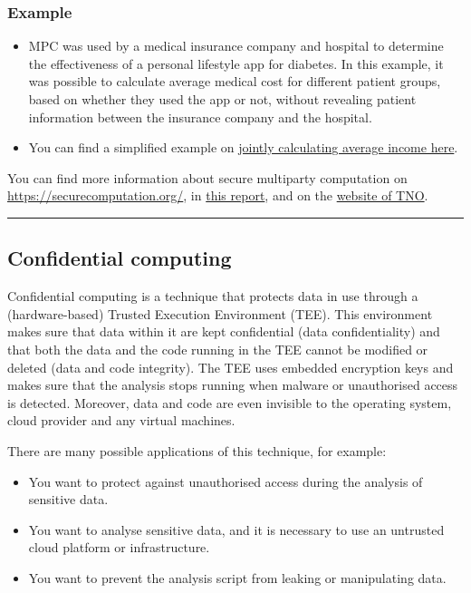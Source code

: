 \documentclass[
]{book}
\providecommand{\tightlist}{%
  \setlength{\itemsep}{0pt}\setlength{\parskip}{0pt}}
\begin{document}
\hypertarget{example}{%
\subsubsection{Example}\label{example}}

\begin{itemize}
\tightlist
\item
  MPC was used by a medical insurance company and hospital to determine the
  effectiveness of a personal lifestyle app for diabetes. In this example, it was
  possible to calculate average medical cost for different patient groups, based
  on whether they used the app or not, without revealing patient information
  between the insurance company and the hospital.
\item
  You can find a simplified example on
  \href{https://www.geeksforgeeks.org/what-is-secure-multiparty-computation/}{jointly calculating average income here}.
\end{itemize}

You can find more information about secure multiparty computation on
\url{https://securecomputation.org/}, in
\href{http://resolver.tudelft.nl/uuid:8002b966-7bba-427c-b343-56326c1a587b}{this report},
and on the \href{https://mpc.tno.nl}{website of TNO}.

\begin{center}\rule{0.5\linewidth}{0.5pt}\end{center}

\hypertarget{confidential-computing}{%
\subsection{Confidential computing}\label{confidential-computing}}

Confidential computing is a technique that protects data in use through a
(hardware-based) Trusted Execution Environment (TEE). This environment makes
sure that data within it are kept confidential (data confidentiality) and that
both the data and the code running in the TEE cannot be modified or deleted
(data and code integrity). The TEE uses embedded encryption keys and makes sure
that the analysis stops running when malware or unauthorised access is detected.
Moreover, data and code are even invisible to the operating system, cloud
provider and any virtual machines.

There are many possible applications of this technique, for example:

\begin{itemize}
\tightlist
\item
  You want to protect against unauthorised access during the analysis of
  sensitive data.
\item
  You want to analyse sensitive data, and it is necessary to use an untrusted
  cloud platform or infrastructure.
\item
  You want to prevent the analysis script from leaking or manipulating data.
\end{itemize}
\end{document}
